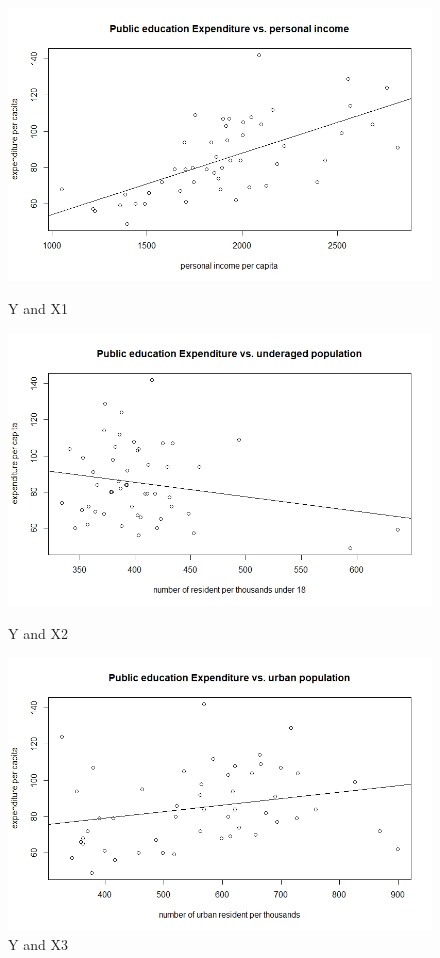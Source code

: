 \documentclass[12pt,letterpaper]{article}
\begin{document}
    \begin{figure}
		\centering
		\includegraphics[width=0.6\linewidth]{Y vs X1.jpeg}
		\caption{Y and X1}
		\label{fig:YX1}

		\centering
		\includegraphics[width=0.6\linewidth]{Y vs X2.jpeg}
		\caption{Y and X2}
		\label{fig:YX2}		

		\centering
		\includegraphics[width=0.6\linewidth]{Y vs X3.jpeg}
		\caption{Y and X3}
		\label{fig:YX3}
		
	\end{figure}
\end{document}
